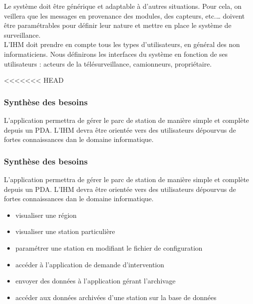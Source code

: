 Le système doit être générique et adaptable à d’autres situations. Pour cela, on veillera que les 
messages en provenance des modules, des capteurs, etc.… doivent être paramétrables pour définir 
leur nature et mettre en place le système de surveillance.\\

L'IHM doit prendre en compte tous les types d'utilisateurs, en général des non informaticiens. 
Nous définirons les interfaces du système en fonction de ses utilisateurs : 
acteurs de la télésurveillance, camionneurs, propriétaire.
 


<<<<<<< HEAD
\subsubsection{Synthèse des besoins}
L'application permettra de gérer le parc de station de manière simple et complète depuis un PDA. 
L'IHM devra être orientée vers des utilisateurs dépourvus de fortes connaissances dan le domaine informatique.\\

\subsubsection{Synthèse des besoins}
L'application permettra de gérer le parc de station de manière simple et complète depuis un PDA. L'IHM devra être orientée vers des utilisateurs dépourvus de fortes connaissances dan le domaine informatique.\\


\begin{itemize}
\item   visualiser une région \\
\item	visualiser une station particulière \\
\item	paramétrer une station en modifiant le fichier de configuration \\
\item	accéder à l'application de demande d'intervention \\
\item	envoyer des données à l'application gérant l'archivage\\ 
\item	accéder aux données archivées d'une station sur la base de données\\
\end{itemize}


